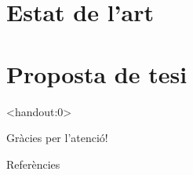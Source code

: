 \documentclass[
   catalan,
   ]{beamer}
\begin{document}
\section{Estat de l'art}



\section{Proposta de tesi}





\begin{frame}<handout:0>
  \addtocounter{framenumber}{-1}

  \begin{center}
    {\huge
      Gràcies per l'atenció!
    }
  \end{center}

\end{frame}





\appendix




\begin{frame}[allowframebreaks]{Referències}

\printbibliography

\end{frame}
\end{document}
